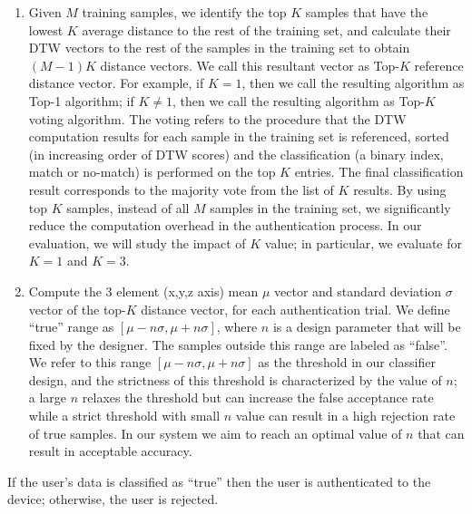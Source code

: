 \begin{enumerate}

\item Given $M$ training samples, we identify the top $K$ samples that have
the lowest $K$ average distance to the rest of the
training set, and calculate their DTW vectors to the rest of the samples in
the training set to obtain $(M-1)K$ distance vectors. We call this resultant
vector as Top-$K$ reference distance vector. For example, if $K = 1$, then we
call the resulting algorithm as Top-1 algorithm; if $K \neq 1$, then we call
the resulting algorithm as Top-$K$ voting algorithm.
The voting refers to the procedure that the DTW computation results for each
sample in the training set is referenced, sorted (in increasing order of DTW
scores) and the classification (a binary index, match or no-match) is
performed on the top $K$ entries. The final classification result corresponds
to the majority vote from the list of $K$ results.
By using top $K$ samples, instead of all $M$ samples in the training set, we
significantly reduce the computation overhead in the authentication
process. In our evaluation, we will study the impact of $K$ value; in
particular, we evaluate for $K = 1$ and $K = 3$.

\item Compute the 3 element (x,y,z axis) mean $\mu$ vector and standard
deviation $\sigma$ vector of the top-$K$ distance vector, for each
authentication trial.
We define ``true'' range as $[\mu-n\sigma, \mu+n\sigma]$, where $n$ is a design
parameter that will be fixed by the designer. The samples outside this
range are labeled as ``false''.
We refer to this range $[\mu-n\sigma, \mu+n\sigma]$ as the threshold in our
classifier design, and the strictness of this threshold is characterized by
the value of $n$; a large $n$ relaxes the threshold but can increase the false
acceptance rate while a strict threshold with small $n$ value can result in a
high rejection rate of true samples. In our system we aim to reach an optimal
value of $n$ that can result in acceptable accuracy.
\end{enumerate}
If the user's data is classified as ``true'' then the user is authenticated to the device; otherwise, the user is rejected.



